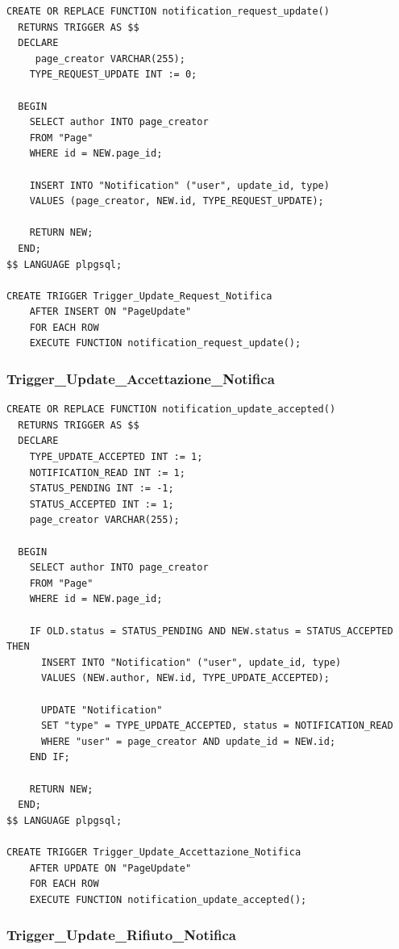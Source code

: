 \documentclass{article}
\begin{document}
	\begin{lstlisting}[style=SQL]
CREATE OR REPLACE FUNCTION notification_request_update()
  RETURNS TRIGGER AS $$
  DECLARE
	 page_creator VARCHAR(255); 
	TYPE_REQUEST_UPDATE INT := 0;
			
  BEGIN
	SELECT author INTO page_creator
	FROM "Page"
	WHERE id = NEW.page_id;
		
	INSERT INTO "Notification" ("user", update_id, type)
	VALUES (page_creator, NEW.id, TYPE_REQUEST_UPDATE);
		
	RETURN NEW;
  END;
$$ LANGUAGE plpgsql;
		
CREATE TRIGGER Trigger_Update_Request_Notifica
	AFTER INSERT ON "PageUpdate"
	FOR EACH ROW
	EXECUTE FUNCTION notification_request_update();
	\end{lstlisting}
	
	\newpage
	
	\subsubsection{Trigger\_Update\_Accettazione\_Notifica}
	
	\begin{lstlisting}[style=SQL]
CREATE OR REPLACE FUNCTION notification_update_accepted()
  RETURNS TRIGGER AS $$
  DECLARE
	TYPE_UPDATE_ACCEPTED INT := 1;
	NOTIFICATION_READ INT := 1;
	STATUS_PENDING INT := -1;
	STATUS_ACCEPTED INT := 1;
	page_creator VARCHAR(255);
				
  BEGIN
	SELECT author INTO page_creator
	FROM "Page"
	WHERE id = NEW.page_id;
		
	IF OLD.status = STATUS_PENDING AND NEW.status = STATUS_ACCEPTED THEN
	  INSERT INTO "Notification" ("user", update_id, type)
  	  VALUES (NEW.author, NEW.id, TYPE_UPDATE_ACCEPTED);
		
	  UPDATE "Notification"
	  SET "type" = TYPE_UPDATE_ACCEPTED, status = NOTIFICATION_READ
	  WHERE "user" = page_creator AND update_id = NEW.id;
	END IF;
		
    RETURN NEW;
  END;
$$ LANGUAGE plpgsql;
		
CREATE TRIGGER Trigger_Update_Accettazione_Notifica
	AFTER UPDATE ON "PageUpdate"
	FOR EACH ROW
	EXECUTE FUNCTION notification_update_accepted();
	\end{lstlisting}
	
	\newpage
	
	\subsubsection{Trigger\_Update\_Rifiuto\_Notifica}
	
\end{document}

